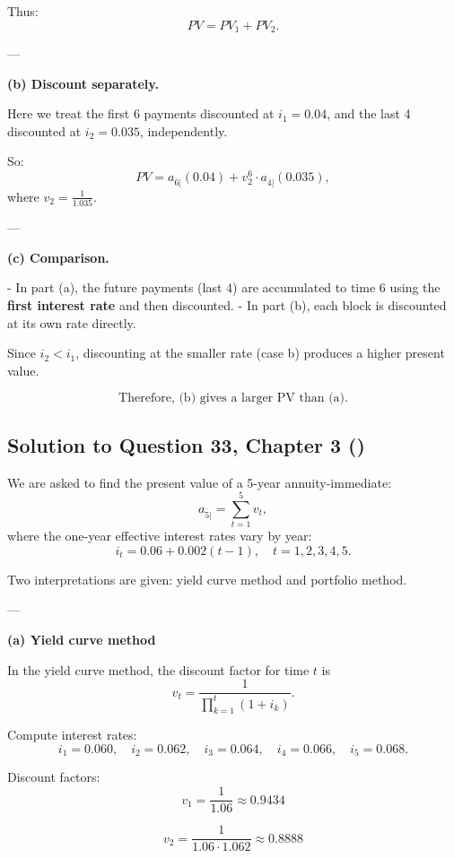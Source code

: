 \documentclass[12pt, a4paper]{article}
\begin{document}
Thus:
\[
PV = PV_1 + PV_2.
\]

---

\textbf{(b) Discount separately.}

Here we treat the first 6 payments discounted at $i_1 = 0.04$, and the last 4 discounted at $i_2 = 0.035$, independently.  

So:
\[
PV = a_{\overline{6}|}(0.04) + v_2^6 \cdot a_{\overline{4}|}(0.035),
\]
where $v_2 = \frac{1}{1.035}$.

---

\textbf{(c) Comparison.}

- In part (a), the future payments (last 4) are accumulated to time 6 using the \textbf{first interest rate} and then discounted.  
- In part (b), each block is discounted at its own rate directly.  

Since $i_2 < i_1$, discounting at the smaller rate (case b) produces a higher present value.  

\[
\boxed{\text{Therefore, (b) gives a larger PV than (a).}}
\]

\subsection*{Solution to Question 33, Chapter 3 (\cite{toi3rd})}

We are asked to find the present value of a 5-year annuity-immediate:
\[
a_{\overline{5}|} = \sum_{t=1}^{5} v_t,
\]
where the one-year effective interest rates vary by year:
\[
i_t = 0.06 + 0.002(t-1), \quad t=1,2,3,4,5.
\]

Two interpretations are given: yield curve method and portfolio method.

---

\textbf{(a) Yield curve method}

In the yield curve method, the discount factor for time $t$ is
\[
v_t = \frac{1}{\prod_{k=1}^t (1+i_k)}.
\]

Compute interest rates:
\[
i_1 = 0.060, \quad i_2 = 0.062, \quad i_3 = 0.064, \quad i_4 = 0.066, \quad i_5 = 0.068.
\]

Discount factors:
\[
v_1 = \frac{1}{1.06} \approx 0.9434
\]

\[
v_2 = \frac{1}{1.06 \cdot 1.062} \approx 0.8888
\]


\newpage
\printbibliography
\end{document}

